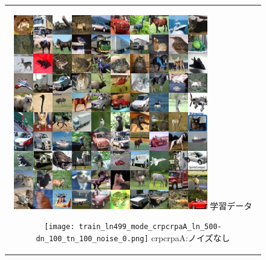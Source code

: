 \documentclass[12pt]{jsarticle}
\begin{document}
\begin{figure}[h]
  \begin{center}
    \begin{tabular}{c}

      \begin{minipage}{0.33\hsize}
        \begin{center}
          \includegraphics[clip, width=\linewidth]{cyfer_ans.jpg}
          \hspace{0.2cm} 学習データ
        \end{center}
      \end{minipage}

      \begin{minipage}{0.33\hsize}
        \begin{center}
          \texttt{[image: train\_ln499\_mode\_crpcrpaA\_ln\_500-dn\_100\_tn\_100\_noise\_0.png]}
          \hspace{0.2cm} crpcrpaA:ノイズなし
        \end{center}
      \end{minipage}


\end{tabular}
\end{center}
\end{figure}
\end{document}
